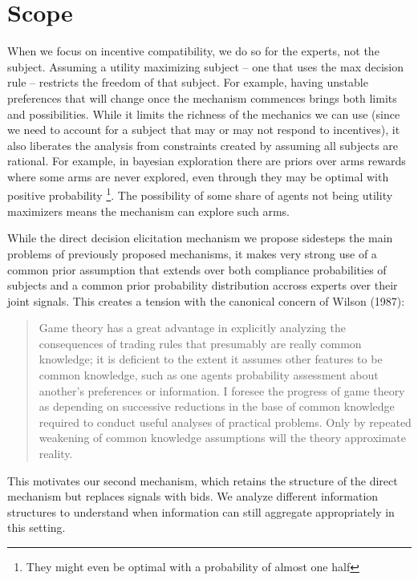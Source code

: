 \section{Scope}

When we focus on incentive compatibility, we do so for the experts, not the subject.
Assuming a utility maximizing subject -- one that uses the max decision rule -- restricts the freedom of that subject.
For example, having unstable preferences that will change once the mechanism commences brings both limits and possibilities.
While it limits the richness of the mechanics we can use (since we need to account for a subject that may or may not respond to incentives), it also liberates the analysis from constraints created by assuming all subjects are rational.
For example, in bayesian  exploration \citep{mansour2015bayesian} there are priors over arms rewards where some arms are never explored, even through they may be optimal with positive probability \footnote{They might even be optimal with a probability of almost one half}. The possibility of some share of agents not being utility maximizers means the mechanism can explore such arms.

While the direct decision elicitation mechanism we propose sidesteps the main problems of previously proposed mechanisms, it makes very strong use of a common prior assumption that extends over both compliance probabilities of subjects and a common prior probability distribution accross experts over their joint signals. This creates a tension with the canonical concern of Wilson (1987):


\begin{quote}
Game theory has a great advantage in explicitly analyzing the consequences of trading rules that presumably are really common knowledge; it is deficient to the extent it assumes other features to be common knowledge, such as one agents probability assessment about another's preferences or information. I foresee the progress of game theory as depending on successive reductions in the base of common knowledge required to conduct useful analyses of practical problems. Only by repeated weakening of common knowledge assumptions will the theory approximate reality.
\end{quote}


This motivates our second mechanism, which retains the structure of the direct mechanism but replaces signals with bids. We analyze different information structures to understand when information can still aggregate appropriately in this setting.

